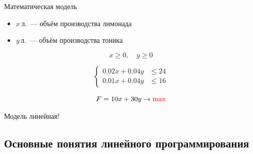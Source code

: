 \documentclass[unicode,11pt,notheorems]{beamer}
\begin{document}
	\begin{frame}{Математическая модель}{}
		
		\begin{itemize}
			\item \alert{$x$}\,л.~--- объём производства лимонада
			\item \alert{$y$}\,л.~--- объём производства тоника
		\end{itemize}
		
		$$
		x \geqslant 0,\quad y \geqslant 0
		$$
		
		$$
		\left\lbrace \begin{aligned}
		0.02x+0.04y &\leqslant 24\\
		0.01x+0.04y &\leqslant 16
		\end{aligned}\right.
		$$
		
		$$
		F=10x+30y \to {\color{red}\max}
		$$
		
		\alert{Модель линейная!}
	\end{frame}
	
%		
%		
%		
%			
	
	
	\subsection{Основные понятия линейного программирования}
	
\end{document}
